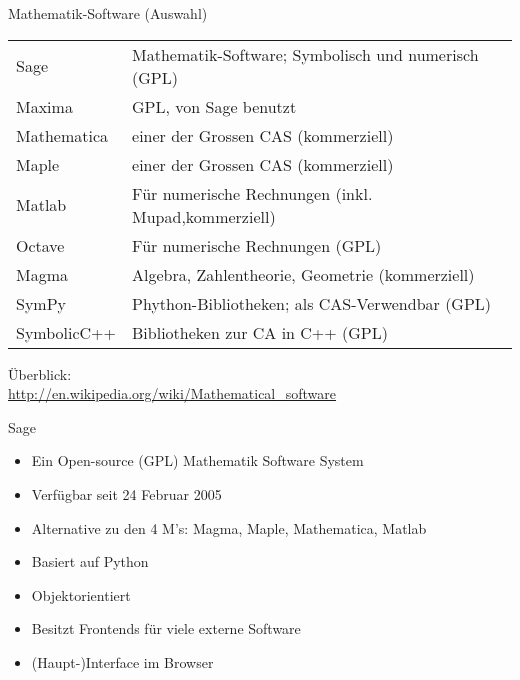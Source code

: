 \documentclass[notes=hide,hyperref={dvipdfmx,pdfpagelabels=false}]{beamer}
\begin{document}
\begin{frame}{Mathematik-Software (Auswahl)}
\begin{small}
\begin{block}{}
\begin{tabular}{ll}
\alert{Sage} & Mathematik-Software; Symbolisch und numerisch (GPL)\\
 \alert{Maxima} & GPL, von Sage benutzt\\
\alert{Mathematica} &einer der Grossen CAS (kommerziell)\\
 \alert{Maple} &einer der Grossen CAS (kommerziell)\\
\alert{Matlab} &Für numerische Rechnungen (inkl. Mupad,kommerziell)\\
\alert{Octave} &Für numerische Rechnungen (GPL)\\
\alert{Magma} & Algebra, Zahlentheorie, Geometrie (kommerziell)\\
 \alert{SymPy} &Phython-Bibliotheken; als CAS-Verwendbar (GPL)\\
 \alert{SymbolicC++} &Bibliotheken zur CA in C++ (GPL)
\end{tabular}

\medskip
Überblick:\\{\scriptsize
\url{http://en.wikipedia.org/wiki/Mathematical_software} }
\end{block}

\end{small}
\end{frame}

\begin{frame}{Sage}
\begin{itemize}
\item Ein Open-source (GPL) Mathematik Software System
\item Verfügbar seit 24 Februar 2005
\item Alternative zu den 4 M's: Magma, Maple, Mathematica, Matlab
\item Basiert auf Python
\item Objektorientiert
\item Besitzt Frontends für viele externe Software 
\item (Haupt-)Interface im Browser 
\end{itemize}
\end{frame}
\end{document}
